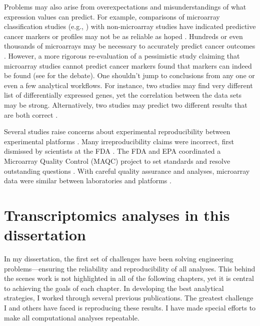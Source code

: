 Problems may also arise from overexpectations and misunderstandings 
of what expression values can predict. 
For example, comparisons of microarray classification
studies (e.g., \cite{Veer:2002vv,Yeoh:2002wg,Alizadeh:2000tn,Golub:1999fn,
Perou:1999fr,Wang:2005uu,VanDeVijver:2002wj,Rosenwald:2002eg,Beer:2002uy,
Bhattacharjee:2001dt,Ramaswamy:2003to,Pomeroy:2002wx,Iizuka:2003wo})
with non-microarray studies have indicated predictive cancer markers or profiles
may not be as reliable as hoped \cite{Miklos:2004wn,Michiels:2007vs,Koscielny:2010gg,Eden:2004ua}.
Hundreds or even thousands of microarrays may be necessary to
accurately predict cancer 
outcomes \cite{Ioannidis:2005kd,Michiels:2005tg,EinDor:2006ga,Frantz:2005ur}.
However, a more rigorous re-evaluation of a pessimistic study claiming
that microarray studies cannot predict cancer markers found that
markers can indeed be found (see \cite{Michiels:2005tg,Fan:2010cv,Tong:2010ka,Koscielny:2010jd}
for the debate).
One shouldn't jump to conclusions from any one or even a few
analytical workflows.
For instance, two studies may find very different
list of differentially expressed genes, yet the correlation
between the data sets may be strong. Alternatively, two studies may
predict two different results that are both correct \cite{Zhang:2008bk,Zhang:2009cy}.

Several studies 
raise concerns about experimental reproducibility between
experimental platforms \cite{Tan:2003be,Kuo:2002cl,
Mah:2004ia,Rogojina:2003te,Woo:2004wz,Li:2002cz,Kothapalli:2002gz}.
Many irreproducibility claims were incorrect, first
dismissed by scientists at the FDA \cite{Shi:2005ik}.
The FDA and EPA coordinated a Microarray Quality Control (MAQC) project
to set standards and resolve outstanding questions 
\cite{Lesko:2004vi,Frueh:2006uy,Dix:2006ty,Shi:2004vh}.
With careful quality assurance and analyses,
microarray data were similar between 
laboratories \cite{Dobbin:2005wj,Irizarry:2005kb,Larkin:2005hb,
Ulrich:2004vw,Waring:2004vh,Weis:2005ut} and
platforms \cite{Petersen:2005by,Yauk:2004fq,
Park:2004ux,Yuen:2002ha,Canales:2006ts,Shippy:2006uf,
Patterson:2006hi,Tong:2006cg,Guo:2006wi}.


\section{Transcriptomics analyses in this dissertation}

In my dissertation, the first set of challenges have
been solving engineering problems---ensuring the reliability
and reproducibility of all analyses. This behind the scenes work is not highlighted
in all of the following chapters, yet it is central
to achieving the goals of each chapter.
In developing the best analytical strategies, I worked
through several previous publications. The greatest challenge
I and others have faced is reproducing these results.
I have made special efforts to make all computational
analyses repeatable. 

